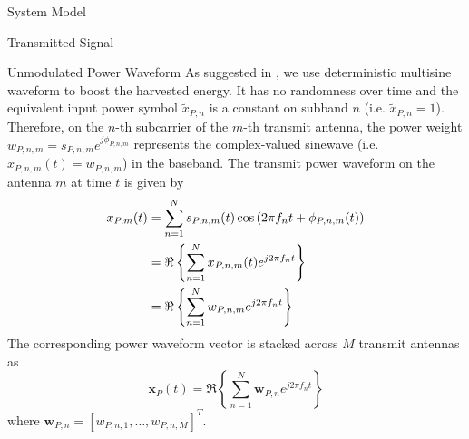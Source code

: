 \documentclass{IEEEtran}
\begin{document}
\begin{section} {System Model}
\begin{subsection} {Transmitted Signal}
		\begin{subsubsection} {Unmodulated Power Waveform}
			As suggested in \cite{Clerckx2018b,Clerckx2016a}, we use deterministic multisine waveform to boost the harvested energy. It has no randomness over time and the equivalent input power symbol $\tilde{x}_{P,n}$ is a constant on subband $n$ (i.e. $\tilde{x}_{P,n} = 1$). Therefore, on the $n$-th subcarrier of the $m$-th transmit antenna, the power weight $w_{P,n,m} = s_{P,n,m} e^{j\phi_{P,n,m}}$ represents the complex-valued sinewave (i.e. $x_{P,n,m}(t) = w_{P,n,m}$) in the baseband. The transmit power waveform on the antenna $m$ at time $t$ is given by
			\begin{equation} \label{eq:x{P,m}(t)}
				\begin{split}
					x_{P,m}(t)
					&= \sum_{n=1}^{N} s_{P,n,m}(t) \cos \left( 2 \pi f_n t + \phi_{P,n,m}(t) \right) \\
					&= \Re \left\{ \sum_{n=1}^{N} x_{P,n,m}(t) e^{j2 \pi f_n t} \right\} \\
					&= \Re \left\{ \sum_{n=1}^{N} w_{P,n,m} e^{j2 \pi f_n t} \right\}
				\end{split}
			\end{equation}
			The corresponding power waveform vector is stacked across $M$ transmit antennas as
			\begin{equation} \label{eq:x_P(t)}
				\boldsymbol{x}_P(t) = \Re \left\{ \sum_{n=1}^{N} \boldsymbol{w}_{P,n} e^{j2{\pi}{f_n}t} \right\}
			\end{equation}
			where $\boldsymbol{w}_{P,n}=[w_{P,n,1},\dots,w_{P,n,M}]^T$.
		\end{subsubsection}


\end{subsection}
\end{section}
\end{document}
